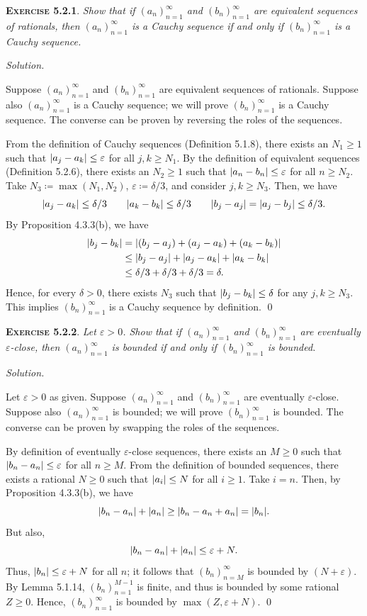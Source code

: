 \documentclass[12pt]{article}
\theoremstyle{remark}
\newenvironment{exer}[2]{
    \noindent \setlength{\parskip}{1em}%
    \textsc{\textbf{Exercise #1}}. \textit{#2} \par
    \noindent \textit{Solution.} %
}{\bigskip}
\begin{document}
\begin{exer}{5.2.1}{
    Show that if $(a_n)^\infty_{n=1}$ and $(b_n)^\infty_{n=1}$ are equivalent sequences of rationals, then $(a_n)^\infty_{n=1}$ is a Cauchy sequence if and only if $(b_n)^\infty_{n=1}$ is a Cauchy sequence.
}
    Suppose $(a_n)^\infty_{n=1}$ and $(b_n)^\infty_{n=1}$ are equivalent sequences of rationals.
    Suppose also $(a_n)^\infty_{n=1}$ is a Cauchy sequence; we will prove $(b_n)^\infty_{n=1}$ is a Cauchy sequence.
    The converse can be proven by reversing the roles of the sequences.
    
    From the definition of Cauchy sequences (Definition 5.1.8), there exists an $N_1 \ge 1$ such that $\abs{a_j - a_k} \le \varepsilon$ for all $j, k \ge N_1$.
    By the definition of equivalent sequences (Definition 5.2.6), there exists an $N_2 \ge 1$ such that $\abs{a_n - b_n} \le \varepsilon$ for all $n \ge N_2$.
    Take $N_3 \coloneqq \max(N_1, N_2)$, $\varepsilon \coloneqq \delta/3$, and consider $j, k \ge N_3$.
    Then, we have
    \[
        \abs{a_j - a_k} \le \delta / 3 \qquad \abs{a_k - b_k} \le \delta/3 \qquad \abs{b_j - a_j} = \abs{a_j - b_j} \le \delta /3.
    \]
    By Proposition 4.3.3(b), we have
    \begin{align*}
        \abs{b_j - b_k}
        &= \abs{(b_j - a_j) + (a_j - a_k) + (a_k - b_k)} \\
        &\le \abs{b_j - a_j} + \abs{a_j - a_k} + \abs{a_k - b_k} \\
        &\le \delta/3 + \delta/3 + \delta/3 = \delta.
    \end{align*}
    Hence, for every $\delta > 0$, there exists $N_3$ such that $\abs{b_j - b_k} \le \delta$ for any $j, k \ge N_3$.
    This implies $(b_n)^\infty_{n=1}$ is a Cauchy sequence by definition. \qed
\end{exer}


\begin{exer}{5.2.2}{
    Let $\varepsilon > 0$.
    Show that if $(a_n)^\infty_{n=1}$ and $(b_n)^\infty_{n=1}$ are eventually $\varepsilon$-close, then $(a_n)^\infty_{n=1}$ is bounded if and only if $(b_n)^\infty_{n=1}$ is bounded.
}
    Let $\varepsilon > 0$ as given.
    Suppose $(a_n)^\infty_{n=1}$ and $(b_n)^\infty_{n=1}$ are eventually $\varepsilon$-close.
    Suppose also $(a_n)^\infty_{n=1}$ is bounded; we will prove $(b_n)^\infty_{n=1}$ is bounded.
    The converse can be proven by swapping the roles of the sequences.

    By definition of eventually $\varepsilon$-close sequences, there exists an $M \ge 0$ such that $\abs{b_n - a_n} \le \varepsilon$ for all $n \ge M$.
    From the definition of bounded sequences, there exists a rational $N \ge 0$ such that $\abs{a_i} \le N$ for all $i \ge 1$.
    Take $i = n$.
    Then, by Proposition 4.3.3(b), we have
    \[
        \abs{b_n - a_n} + \abs{a_n} \ge \abs{b_n - a_n + a_n} = \abs{b_n}.
    \]
    But also,
    \[
        \abs{b_n - a_n} + \abs{a_n} \le \varepsilon + N.
    \]
    Thus, $\abs{b_n} \le \varepsilon + N$ for all $n$; it follows that $(b_n)^\infty_{n=M}$ is bounded by $(N + \varepsilon)$.
    By Lemma 5.1.14, $(b_n)^{M-1}_{n=1}$ is finite, and thus is bounded by some rational $Z \ge 0$.
    Hence, $(b_n)^\infty_{n=1}$ is bounded by $\max{(Z, \varepsilon + N)}$. \qed
\end{exer}
\end{document}
